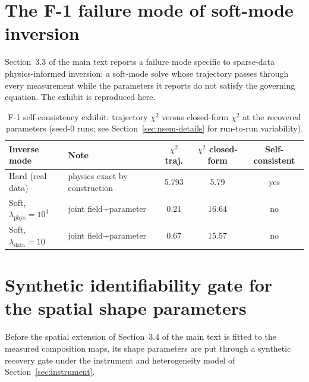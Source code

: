 \section{The F-1 failure mode of soft-mode inversion}
\label{sec:f1}

Section~3.3 of the main text reports a failure mode specific to sparse-data
physics-informed inversion: a soft-mode solve whose trajectory passes through
every measurement while the parameters it reports do not satisfy the governing
equation. The exhibit is reproduced here.

\begin{table}[htbp]
\centering
\caption{F-1 self-consistency exhibit: trajectory $\chi^2$ versus
closed-form $\chi^2$ at the recovered parameters (seed-0 runs; see
Section~\ref{sec:nsem-details} for run-to-run variability).}
\label{tab:f1}
\begin{tabular}{llccc}
\toprule
Inverse mode & Note & $\chi^2$ traj. & $\chi^2$ closed-form & Self-consistent \\
\midrule
Hard (real data) & physics exact by construction & 5.793 & 5.79 & yes \\
Soft, $\lambda_\text{phys}=10^3$ & joint field+parameter & 0.21 & 16.64 & no \\
Soft, $\lambda_\text{data}=10$ & joint field+parameter & 0.67 & 15.57 & no \\
\bottomrule
\end{tabular}
\end{table}

\section{Synthetic identifiability gate for the spatial shape parameters}
\label{sec:gate}

Before the spatial extension of Section~3.4 of the main text is fitted to the
measured composition maps, its shape parameters are put through a synthetic
recovery gate under the instrument and heterogeneity model of
Section~\ref{sec:instrument}.

